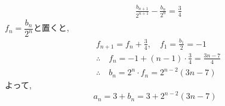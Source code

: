 \begin{enumerate}[label=(\arabic*),parsep=3pt]
            \begin{align*}
              &\frac{b_{n+1}}{2^{n+1}}-\frac{b_n}{2^n}=\frac34
            \end{align*}
            $f_n=\dfrac{b_n}{2^n}$と置くと,
            \begin{align*}
              &f_{n+1}=f_n+\frac34,\quad f_1=\frac{b_1}{2}=-1\\
              &\therefore \quad f_n=-1+(n-1)\cdot\frac34=\frac{3n-7}{4}\\
              &\therefore \quad b_n=2^n\cdot f_n=2^{n-2}(3n-7)
            \end{align*}
            よって,
            \[
              a_n=3+b_n=3+2^{n-2}(3n-7)
            \]
    \end{enumerate}
